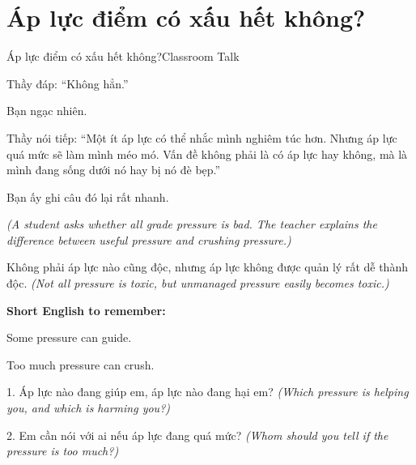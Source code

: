 \section{Áp lực điểm có xấu hết không?}
\begin{truyen}{Áp lực điểm có xấu hết không?}{Classroom Talk}

Thầy đáp: ``Không hẳn.''

Bạn ngạc nhiên.

Thầy nói tiếp: ``Một ít áp lực có thể nhắc mình nghiêm túc hơn. Nhưng áp lực quá mức sẽ làm mình méo mó. Vấn đề không phải là có áp lực hay không, mà là mình đang sống dưới nó hay bị nó đè bẹp.''

Bạn ấy ghi câu đó lại rất nhanh.

\textit{(A student asks whether all grade pressure is bad. The teacher explains the difference between useful pressure and crushing pressure.)}
\end{truyen}

\begin{baihoc}
Không phải áp lực nào cũng độc, nhưng áp lực không được quản lý rất dễ thành độc.
\textit{(Not all pressure is toxic, but unmanaged pressure easily becomes toxic.)}
\end{baihoc}

\begin{ghinhoanh}
\textbf{Short English to remember:}

Some pressure can guide.

Too much pressure can crush.
\end{ghinhoanh}

\begin{tuhocnhanh}
1. Áp lực nào đang giúp em, áp lực nào đang hại em? \textit{(Which pressure is helping you, and which is harming you?)}

2. Em cần nói với ai nếu áp lực đang quá mức? \textit{(Whom should you tell if the pressure is too much?)}
\end{tuhocnhanh}
\ngancach